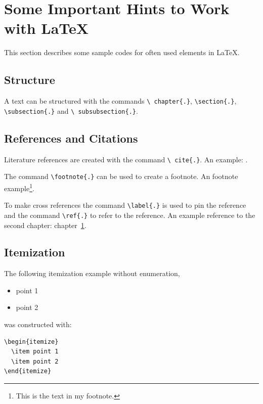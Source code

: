 
\chapter{Some Important Hints to Work with \LaTeX\ }\label{sec:latexenv}

This section describes some sample codes for often used elements in \LaTeX.

\section{Structure}\label{sec:structure}

A text can be structured with the commands \texttt{\textbackslash
chapter\{.\}}, \texttt{\textbackslash section\{.\}},
\texttt{\textbackslash subsection\{.\}} and \texttt{\textbackslash
subsubsection\{.\}}.

\section{References and Citations}\label{sec:refverw}

Literature references are created with the command  \texttt{\textbackslash
cite\{.\}}. An example: \cite{mahony2005complementary}.

The command \texttt{\textbackslash footnote\{.\}} can be used to create a footnote.
An footnote example\footnote{This is the text in my footnote.}.

To make cross references the command \texttt{\textbackslash label\{.\}} is used to pin the reference and the command \texttt{\textbackslash ref\{.\}}  to refer to the reference.
An example reference to the second chapter: chapter~\ref{sec:latexenv}.


\section{Itemization}\label{sec:item}

The following itemization example without enumeration,
\begin{itemize}
  \item point 1
  \item point 2
\end{itemize}
was constructed with:
\begin{verbatim}
\begin{itemize}
  \item point 1
  \item point 2
\end{itemize}
\end{verbatim}

